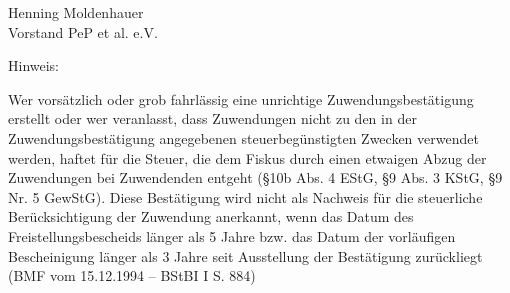 \documentclass[fontsize=12pt, paper=a4, DIV14, parskip]{scrartcl}
\begin{document}
\vspace{20pt}

Henning Moldenhauer\\
Vorstand PeP et al. e.V.

{\fontsize{10}{10} \selectfont
Hinweis:

Wer vorsätzlich oder grob fahrlässig eine unrichtige Zuwendungsbestätigung erstellt oder wer veranlasst, dass Zuwendungen nicht zu den in der Zuwendungsbestätigung angegebenen steuerbegünstigten Zwecken verwendet werden, haftet für die Steuer, die dem Fiskus durch einen etwaigen Abzug der Zuwendungen bei Zuwendenden entgeht (§10b Abs. 4 EStG, §9 Abs. 3 KStG, §9 Nr. 5 GewStG).
\newline
Diese Bestätigung wird nicht als Nachweis für die steuerliche Berücksichtigung der Zuwendung anerkannt, wenn das Datum des Freistellungsbescheids länger als 5 Jahre bzw. das Datum der vorläufigen Bescheinigung länger als 3 Jahre seit Ausstellung der Bestätigung zurückliegt (BMF vom 15.12.1994 – BStBI I S. 884)

}
\end{document}
